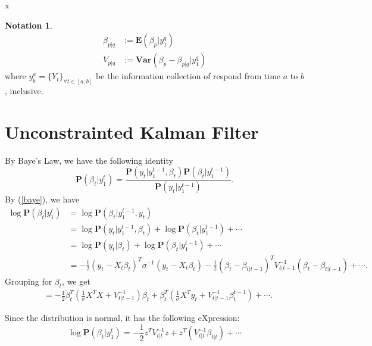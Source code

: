 \message{ !name(kalman_filter.tex)}x\documentclass{article}
\numberwithin{algorithm}{section}
\theoremstyle{plain}
\theoremstyle{definition}
\newtheorem{notation}[thm]{Notation}\small
\theoremstyle{remark}
\newcommand{\E}{\mathbf{E}}
\newcommand{\Var}{\mathbf{Var}}
\newcommand{\PP}{\mathbf{P}}
\begin{document}
\begin{notation}
\begin{equation*}
\begin{split}
\beta_{p|q} &:= \E(\beta_p |y^q_1 )\\
V_{p|q} &:= \Var(\beta_p - \beta_{p|q} |y^q_1  ) 
\end{split}
\end{equation*}
where $y^a_b = \{Y_t\}_{\forall t \in [a,b]}$ be the information collection of respond from time $a$ to $b$, inclusive.
\end{notation}

\section{Unconstrainted Kalman Filter}
By Baye's Law, we have the following identity
\begin{equation}
\PP(\beta_t | y_1^t) = \frac{ \PP(y_t |  y^{t-1}_1, \beta_t) \PP ( \beta_t | y ^{t-1}_1)}{\PP(y_t |  y_1^{t-1})}.
\label{baye}
\end{equation}
By (\ref{baye}), we have 
\begin{equation}
\begin{split}
\log \PP(\beta_t |  y^t_1) &= \log \PP(\beta_t |  y^{t-1}_1, y_t)\\
&= \log \PP(y_t |  y^{t-1}_1, \beta_t) + \log \PP ( \beta_t | y ^{t-1}_1) + \cdots\\
&= \log \PP(y_t |  \beta_t) + \log \PP ( \beta_t | y ^{t-1}_1) + \cdots\\
&= - \frac12 (y_t - X_t \beta_t )^T \sigma ^{-1}  (y_t - X_t \beta_t ) - \frac12 (\beta_t - \beta_{t|t-1})^T V_{t|t-1}^{-1} (\beta_t - \beta_{t|t-1})+ \cdots.
\end{split}
\end{equation}
Grouping for $\beta_t$, we get
\begin{equation}
\begin{split}
&= - \frac12 \beta^T_t (\frac1\sigma X^T X + V_{t|t-1}^{-1}) \beta_t + \beta^T_t ( \frac1\sigma X^T y_t + V_{t|t-1}^{-1} \beta_t^{t-1}) + \cdots.
\end{split}
\end{equation}

Since the distribution is normal, it has the following eXpression:
\begin{equation}
\log \PP(\beta_t |  y^t_1) = -\frac12 z^T V_{t|t}^{-1} z + z^T ( V_{t|t}^{-1} \beta_{t|t}) + \cdots
\end{equation}
\end{document}
